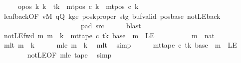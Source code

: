 \begin{isabellebody}
\ \ \ \ \ opos{}{\isacharcolon}{\kern0pt}\ {\isachardoublequoteopen}{\isasymforall}k{\isacharprime}{\kern0pt}{\isachardot}{\kern0pt}\ k{\isacharprime}{\kern0pt}\ {\isasymnoteq}\ tk\ {\isasymlongrightarrow}\ mt{\isacharunderscore}{\kern0pt}pos\ c{}\ k{\isacharprime}{\kern0pt}\ {\isacharequal}{\kern0pt}\ mt{\isacharunderscore}{\kern0pt}pos\ c{\isacharprime}{\kern0pt}\ k{\isacharprime}{\kern0pt}{\isachardoublequoteclose}\isanewline
\ \ \ \ \isamarkupfalse%
\ leaf{\isacharunderscore}{\kern0pt}back{\isacharbrackleft}{\kern0pt}OF\ vM\ qQ\ kge{}\ poskproper\ stg\ buf{\isacharunderscore}{\kern0pt}valid\ pos{\isacharunderscore}{\kern0pt}base\ notLE{\isacharunderscore}{\kern0pt}back\isanewline
\ \ \ \ \ \ \ \ \ \ \ \ \ \ \ \ \ \ \ \ \ \ \ pad{}\ src{}{\isacharbrackright}{\kern0pt}\isanewline
\ \ \ \ \isamarkupfalse%
\ blast\isanewline
\ \ \isamarkupfalse%
\ notLE{\isacharunderscore}{\kern0pt}fwd{\isacharcolon}{\kern0pt}\ {\isachardoublequoteopen}{\isasymAnd}m{\isachardot}{\kern0pt}\ m\ {\isacharless}{\kern0pt}\ {\isacharquery}{\kern0pt}k\ {\isasymLongrightarrow}\ mt{\isacharunderscore}{\kern0pt}tape\ c{}\ tk\ {\isacharparenleft}{\kern0pt}base\ {\isacharplus}{\kern0pt}\ m{\isacharparenright}{\kern0pt}\ {\isasymnoteq}\ LE{}{\isachardoublequoteclose}\isanewline
\ \ \isamarkupfalse%
\ {\isacharminus}{\kern0pt}\isanewline
\ \ \ \ \isamarkupfalse%
\ m\ {\isacharcolon}{\kern0pt}{\isacharcolon}{\kern0pt}\ nat\ \isamarkupfalse%
\ mlt{\isacharcolon}{\kern0pt}\ {\isachardoublequoteopen}m\ {\isacharless}{\kern0pt}\ {\isacharquery}{\kern0pt}k{\isachardoublequoteclose}\isanewline
\ \ \ \ \isamarkupfalse%
\ mle{\isacharcolon}{\kern0pt}\ {\isachardoublequoteopen}m\ {\isasymle}\ {\isacharquery}{\kern0pt}k{\isachardoublequoteclose}\ \isamarkupfalse%
\ mlt\ \isamarkupfalse%
\ simp\isanewline
\ \ \ \ \isamarkupfalse%
\ {\isachardoublequoteopen}mt{\isacharunderscore}{\kern0pt}tape\ c{}\ tk\ {\isacharparenleft}{\kern0pt}base\ {\isacharplus}{\kern0pt}\ m{\isacharparenright}{\kern0pt}\ {\isasymnoteq}\ LE{}{\isachardoublequoteclose}\isanewline
\ \ \ \ \ \ \isamarkupfalse%
\ notLE{\isacharbrackleft}{\kern0pt}OF\ mle{\isacharbrackright}{\kern0pt}\ tape{}\ \isamarkupfalse%
\ simp\isanewline
\ \ \isamarkupfalse%

\end{isabellebody}
